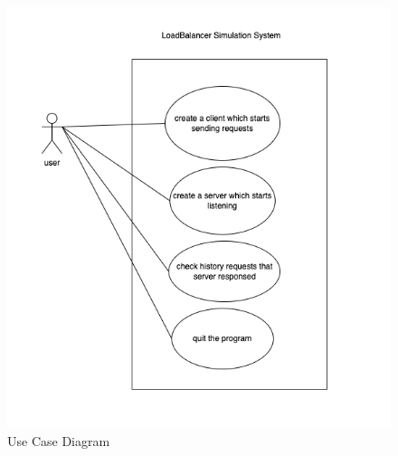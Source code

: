 \documentclass[12pt]{article}
\begin{document}
\begin{figure}[H]
    \centering
    \includegraphics[width=\linewidth]{images/uc.png}
    \caption{Use Case Diagram}
    \label{fig:Use_Case_Diagram}
\end{figure}
\end{document}
